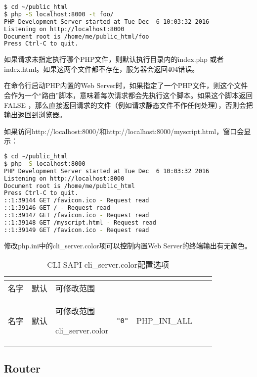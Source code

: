 \begin{lstlisting}[language=bash]
$ cd ~/public_html
$ php -S localhost:8000 -t foo/
PHP Development Server started at Tue Dec  6 10:03:32 2016
Listening on http://localhost:8000
Document root is /home/me/public_html/foo
Press Ctrl-C to quit.
\end{lstlisting}

如果请求未指定执行哪个PHP文件，则默认执行目录内的index.php 或者 index.html。如果这两个文件都不存在，服务器会返回404错误。

在命令行启动PHP内置的Web Server时，如果指定了一个PHP文件，则这个文件会作为一个“路由”脚本，意味着每次请求都会先执行这个脚本。如果这个脚本返回 FALSE ，那么直接返回请求的文件（例如请求静态文件不作任何处理），否则会把输出返回到浏览器。

如果访问http://localhost:8000/和http://localhost:8000/myscript.html，窗口会显示：

\begin{lstlisting}[language=bash]
$ cd ~/public_html
$ php -S localhost:8000
PHP Development Server started at Tue Dec  6 10:03:32 2016
Listening on http://localhost:8000
Document root is /home/me/public_html
Press Ctrl-C to quit.
::1:39144 GET /favicon.ico - Request read
::1:39146 GET / - Request read
::1:39147 GET /favicon.ico - Request read
::1:39148 GET /myscript.html - Request read
::1:39149 GET /favicon.ico - Request read
\end{lstlisting}

修改php.ini中的cli\_server.color项可以控制内置Web Server的终端输出有无颜色。


\begin{longtable}{|m{60pt}|m{30pt}|m{100pt}|}
\tabularnewline\hline
名字&默认&可修改范围
\endhead

\caption{CLI SAPI cli\_server.color配置选项}\\
\hline
名字&默认&可修改范围
\endfirsthead

\endfoot

\endlastfoot
\hline
cli\_server.color&\texttt{"0"}&PHP\_INI\_ALL\\
\hline
\end{longtable}

\subsection{Router}







